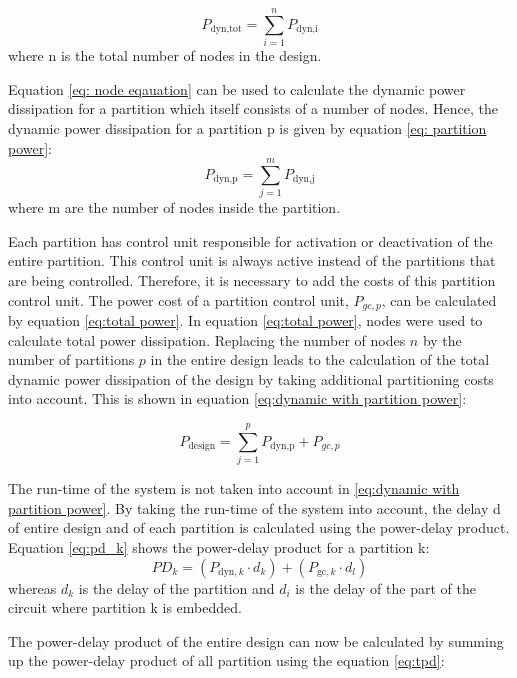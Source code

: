 \documentclass[conference]{IEEEtran}
\begin{document}
\begin{equation}
\label{eq:total power}
P_{\text{dyn,tot}} = \sum_{i=1}^{n} P_{\text{dyn,i}} 
\end{equation}
where n is the total number of nodes in the design. 

Equation \ref{eq: node eqauation} can be used to calculate the dynamic power dissipation for a partition which itself consists of a number of nodes. Hence, the dynamic power dissipation for a partition p is given by equation \ref{eq: partition power}:
\begin{equation}
\label{eq: partition power}
P_{\text{dyn,p}} = \sum_{j=1}^{m} P_{\text{dyn,j}} 
\end{equation}
where m are the number of nodes inside the partition. 


Each partition has control unit responsible for activation or deactivation of the entire partition. This control unit is always active instead of the partitions that are being controlled. Therefore, it is necessary to add the costs of this partition control unit. The power cost of a partition control unit, $P_{gc,p}$, can be calculated by equation \ref{eq:total power}. In equation \ref{eq:total power}, nodes were used to calculate total power dissipation. Replacing the number of nodes $n$ by the number of partitions $p$ in the entire design leads to the calculation of the total dynamic power dissipation of the design by taking additional partitioning costs into account. This is shown in equation \ref{eq:dynamic with partition power}:

\begin{equation}
\label{eq:dynamic with partition power}
P_{\text{design}} = \sum_{j=1}^{p} P_{\text{dyn,p}} + P_{gc,p} 
\end{equation}

The run-time of the system is not taken into account in \ref{eq:dynamic with partition power}. By taking the run-time of the system into account, the delay d of entire design and of each partition is calculated using the power-delay product. Equation \ref{eq:pd_k} shows the power-delay product for a partition k:
\begin{equation}
PD_k = (P_{\text{dyn},k} \cdot d_k) + (P_{\text{gc},k} \cdot d_l)
\label{eq:pd_k}
\end{equation}
whereas $d_k$ is the delay of the partition and $d_i$ is the delay of the part of the circuit where partition k is embedded.

The power-delay product of the entire design can now be calculated by summing up the power-delay product of all partition using the equation \ref{eq:tpd}:
\end{document}
